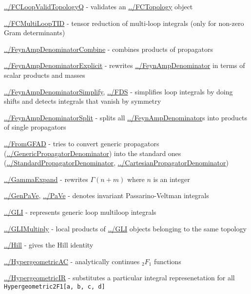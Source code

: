 \documentclass[../FeynCalcManual.tex]{subfiles}
\begin{document}
\begin{itemize}
{  \hyperlink{../fcloopvalidtopologyq}{../FCLoopValidTopologyQ} -
  validates an \hyperlink{../fctopology}{../FCTopology} object
\item
  \hyperlink{../fcmultilooptid}{../FCMultiLoopTID} - tensor reduction of
  multi-loop integrals (only for non-zero Gram determinants)
\item
  \hyperlink{../feynampdenominatorcombine}{../FeynAmpDenominatorCombine}
  - combines products of propagators
\item
  \hyperlink{../feynampdenominatorexplicit}{../FeynAmpDenominatorExplicit}
  - rewrites \hyperlink{../feynampdenominator}{../FeynAmpDenominator} in
  terms of scalar products and masses
\item
  \hyperlink{../feynampdenominatorsimplify}{../FeynAmpDenominatorSimplify},
  \hyperlink{../fds}{../FDS} - simplifies loop integrals by doing shifts
  and detects integrals that vanish by symmetry
\item
  \hyperlink{../feynampdenominatorsplit}{../FeynAmpDenominatorSplit} -
  splits all \hyperlink{../feynampdenominator}{../FeynAmpDenominator}s
  into products of single propagators
\item
  \hyperlink{../fromgfad}{../FromGFAD} - tries to convert generic
  propagators
  (\hyperlink{../genericpropagatordenominator}{../GenericPropagatorDenominator})
  into the standard ones
  (\hyperlink{../standardpropagatordenominator}{../StandardPropagatorDenominator},
  \hyperlink{../cartesianpropagatordenominator}{../CartesianPropagatorDenominator})
\item
  \hyperlink{../gammaexpand}{../GammaExpand} - rewrites \(\Gamma(n+m)\)
  where \(n\) is an integer
\item
  \hyperlink{../genpave}{../GenPaVe}, \hyperlink{../pave}{../PaVe} -
  denotes invariant Passarino-Veltman integrals
\item
  \hyperlink{../gli}{../GLI} - represents generic loop multiloop
  integrals
\item
  \hyperlink{../glimultiply}{../GLIMultiply} - local products of
  \hyperlink{../gli}{../GLI} objects belonging to the same topology
\item
  \hyperlink{../hill}{../Hill} - gives the Hill identity
\item
  \hyperlink{../hypergeometricac}{../HypergeometricAC} - analytically
  continues \({}_2 F_1\) functions
\item
  \hyperlink{../hypergeometricir}{../HypergeometricIR} - substitutes a
  particular integral represenetation for all
  \texttt{Hypergeometric2F1[\allowbreak{}a,\ \allowbreak{}b,\ \allowbreak{}c,\ \allowbreak{}d]}
}
\end{itemize}
\end{document}
